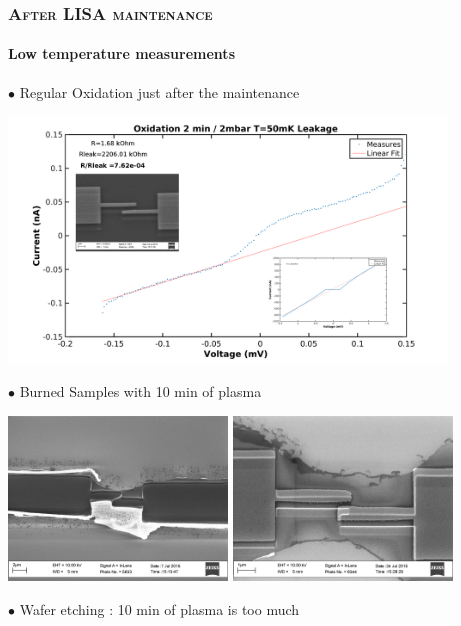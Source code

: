 \documentclass{beamer}
\begin{document}
    \begin{frame}[allowframebreaks]
        \frametitle{\textsc{After LISA maintenance}}
        \framesubtitle{Low temperature measurements}
        $\bullet$  Regular Oxidation just after the maintenance
        \vspace{0.3cm}
        
        \includegraphics[width=330pt]{AfterLISAOx.png}
        \vspace{1cm}
                       
        $\bullet$  Burned Samples with 10 min of plasma
        \vspace{0.5cm}
        
       \includegraphics[width=165pt]{Burned2.png}
       \includegraphics[width=165pt]{Burned1.png}
              
              \vspace{3cm}
              
       $\bullet$ Wafer etching : 10 min of plasma is too much
       \vspace{0.5cm}
       

\end{frame}
\end{document}
